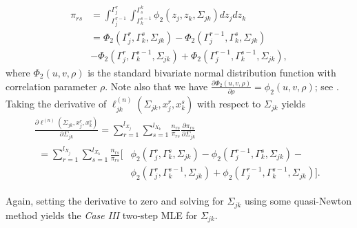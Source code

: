 \begin{equation}
    \begin{split}
        \pi_{rs} &= \int_{{\Gamma}_j^{r-1}}^{{\Gamma}_j^{r}} \int_{{\Gamma}_k^{s-1}}^{{\Gamma}^k_{s}} \phi_2(z_j,z_k,\Sigma_{jk}) dz_j dz_k \\
        &= \Phi_2({\Gamma}_j^r, {\Gamma}_k^s, \Sigma_{jk}) - \Phi_2({\Gamma}_j^{r-1}, {\Gamma}_k^s, \Sigma_{jk}) \\
        &- \Phi_2({\Gamma}_j^r, {\Gamma}_k^{s-1}, \Sigma_{jk}) + \Phi_2({\Gamma}_j^{r-1}, {\Gamma}_k^{s-1}, \Sigma_{jk}),
    \end{split}
\end{equation}
where $\Phi_2(u,v,\rho)$ is the standard bivariate normal distribution function with correlation parameter $\rho$. Note also that we have $\frac{\partial \Phi_2(u,v, \rho)}{\partial \rho} = \phi_2(u,v, \rho)$; see \citep{Tallis62}. Taking the derivative of $\ell_{jk}^{(n)}(\Sigma_{jk}, x_j^r,x_k^s)$ with respect to $\Sigma_{jk}$ yields
\begin{multline*}
        \frac{\partial \ell^{(n)}(\Sigma_{jk}, x_j^r,x_k^s)}{\partial \Sigma_{jk}} = \sum_{r=1}^{l_{X_{j}}}\sum_{s=1}^{l_{X_{k}}} \frac{n_{rs}}{\pi_{rs}} \frac{\partial \pi_{rs}}{\partial \Sigma_{jk}} \\
        \begin{aligned}
        = \sum_{r=1}^{l_{X_{j}}}\sum_{s=1}^{l_{X_{k}}} \frac{n_{rs}}{\pi_{rs}} \Big[&\phi_2({\Gamma}_j^r, {\Gamma}_k^s, \Sigma_{jk}) - \phi_2({\Gamma}_j^{r-1}, {\Gamma}_k^s, \Sigma_{jk}) - \\
        &\phi_2({\Gamma}_j^r, {\Gamma}_k^{s-1}, \Sigma_{jk}) + \phi_2({\Gamma}_j^{r-1}, {\Gamma}_k^{s-1}, \Sigma_{jk})\Big].
        \end{aligned}
\end{multline*}

Again, setting the derivative to zero and solving for $\Sigma_{jk}$ using some quasi-Newton method yields the \textit{Case III} two-step MLE for $\Sigma_{jk}$.



